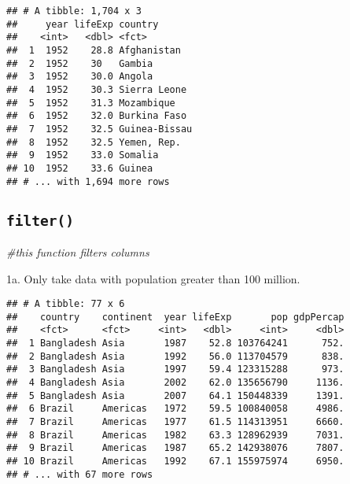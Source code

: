 \documentclass[]{article}
\newenvironment{Shaded}{\begin{snugshade}}{\end{snugshade}}
\newcommand{\KeywordTok}[1]{\textcolor[rgb]{0.13,0.29,0.53}{\textbf{{#1}}}}
\newcommand{\DecValTok}[1]{\textcolor[rgb]{0.00,0.00,0.81}{{#1}}}
\newcommand{\StringTok}[1]{\textcolor[rgb]{0.31,0.60,0.02}{{#1}}}
\newcommand{\CommentTok}[1]{\textcolor[rgb]{0.56,0.35,0.01}{\textit{{#1}}}}
\newcommand{\NormalTok}[1]{{#1}}
\begin{document}
\begin{verbatim}
## # A tibble: 1,704 x 3
##     year lifeExp country      
##    <int>   <dbl> <fct>        
##  1  1952    28.8 Afghanistan  
##  2  1952    30   Gambia       
##  3  1952    30.0 Angola       
##  4  1952    30.3 Sierra Leone 
##  5  1952    31.3 Mozambique   
##  6  1952    32.0 Burkina Faso 
##  7  1952    32.5 Guinea-Bissau
##  8  1952    32.5 Yemen, Rep.  
##  9  1952    33.0 Somalia      
## 10  1952    33.6 Guinea       
## # ... with 1,694 more rows
\end{verbatim}

\subsection{\texorpdfstring{\texttt{filter()}}{filter()}}\label{filter}

\begin{Shaded}
\begin{Highlighting}[]
\CommentTok{#this function filters columns}
\end{Highlighting}
\end{Shaded}

1a. Only take data with population greater than 100 million.

\begin{Shaded}
\end{Shaded}

\begin{verbatim}
## # A tibble: 77 x 6
##    country    continent  year lifeExp       pop gdpPercap
##    <fct>      <fct>     <int>   <dbl>     <int>     <dbl>
##  1 Bangladesh Asia       1987    52.8 103764241      752.
##  2 Bangladesh Asia       1992    56.0 113704579      838.
##  3 Bangladesh Asia       1997    59.4 123315288      973.
##  4 Bangladesh Asia       2002    62.0 135656790     1136.
##  5 Bangladesh Asia       2007    64.1 150448339     1391.
##  6 Brazil     Americas   1972    59.5 100840058     4986.
##  7 Brazil     Americas   1977    61.5 114313951     6660.
##  8 Brazil     Americas   1982    63.3 128962939     7031.
##  9 Brazil     Americas   1987    65.2 142938076     7807.
## 10 Brazil     Americas   1992    67.1 155975974     6950.
## # ... with 67 more rows
\end{verbatim}
\end{document}
